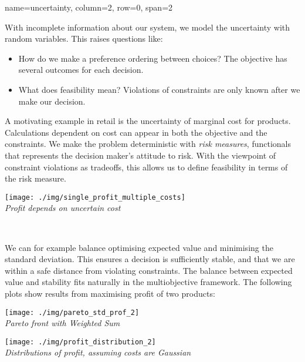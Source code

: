 \documentclass[a0paper,landscape,fontscale=0.35]{baposter}
\newcommand{\mycaption}[1]{
  {
    \smaller
    \emph{#1}
  }
}
\begin{document}
\begin{poster}
{name=uncertainty, column=2, row=0, span=2}
{
  \begin{minipage}[h]{0.7\textwidth}
    With incomplete information about our system, we model the
    uncertainty with random variables. This raises questions like:
    \begin{itemize}
    \item How do we make a preference ordering between choices? The
      objective has several outcomes for each decision.
    \item What does feasibility mean? Violations of constraints
      are only known after we make our decision.
    \end{itemize}
    A motivating example in retail is the uncertainty of marginal cost
    for products. Calculations dependent on cost can appear in
    both the objective and the constraints.
    We make the problem deterministic with \emph{risk measures},
    functionals that represents the decision maker's attitude to risk.
    With the viewpoint of constraint violations as tradeoffs, this
    allows us to define feasibility in terms of the risk measure.
  \end{minipage}%
  \begin{minipage}[h]{0.3\textwidth}
    \centering
    \texttt{[image: ./img/single\_profit\_multiple\_costs]}\\
    \mycaption{Profit depends on uncertain cost}
  \end{minipage}\\[1em]

  \begin{minipage}[h]{\textwidth}
    We can for example balance optimising
    expected value and minimising the standard deviation.
    This ensures a decision is sufficiently stable, and that we are
    within a safe distance from violating constraints. The balance
    between expected value and stability fits naturally in the
    multiobjective framework. The following plots show results from
    maximising profit of two products:
    \\[0.7em]
    \begin{minipage}{\textwidth}
      \begin{minipage}{0.5\textwidth}
        \centering
        \texttt{[image: ./img/pareto\_std\_prof\_2]}\\
        \mycaption{Pareto front with Weighted Sum}
      \end{minipage}%
      \begin{minipage}{0.5\textwidth}
        \centering
        \texttt{[image: ./img/profit\_distribution\_2]}\\
        \mycaption{Distributions of profit, assuming costs are Gaussian}
      \end{minipage}
    \end{minipage}
  \end{minipage}\\[1em]

}
\end{poster}
\end{document}
